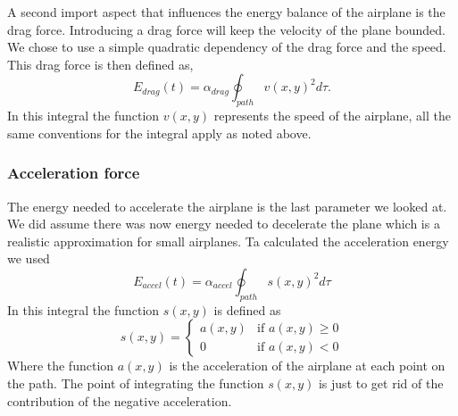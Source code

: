 A second import aspect that influences the energy balance of the airplane is the drag force.
Introducing a drag force will keep the velocity of the plane bounded.
We chose to use a simple quadratic dependency of the drag force and the speed.
This drag force is then defined as,
\begin{equation}
E_{drag}(t)  =  \alpha_{drag} \oint_{path} v(x,y)^2  d \tau.
\end{equation}
In this integral the function $ v(x,y) $ represents the speed of the airplane, all the same conventions for the integral apply as noted above.


\subsubsection{Acceleration force}

The energy needed to accelerate the airplane is the last parameter we looked at.
We did assume there was now energy needed to decelerate the plane which is a realistic approximation for small airplanes.
Ta calculated the acceleration energy we used
\begin{equation}
E_{accel}(t)  =  \alpha_{accel} \oint_{path} s(x,y)^2  d \tau
\end{equation}
In this integral the function $ s(x,y) $ is defined as
\begin{equation}
s(x,y) = 
\begin{cases}
   a(x,y) & \text{if } a(x,y) \geq 0 \\
   0       & \text{if } a(x,y) < 0
  \end{cases}
\end{equation}
Where the function $ a(x,y) $ is the acceleration of the airplane at each point on the path.
The point of integrating the function $ s(x,y) $ is just to get rid of the contribution of the negative acceleration.





